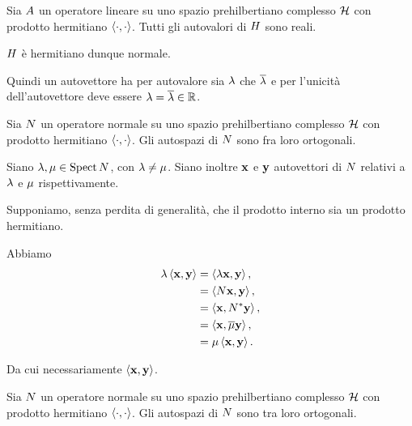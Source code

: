 \begin{Corollary}
  Sia $A$ un operatore lineare su uno spazio prehilbertiano
  complesso $\mathcal{H}$ con prodotto hermitiano
  $\left \langle \cdot , \cdot \right \rangle$. Tutti gli autovalori di
  $H$ sono reali.
\end{Corollary}
\Proof $H$ \`e hermitiano dunque normale.
\par Quindi un autovettore ha per autovalore sia $\lambda$ che
$\overline{\lambda}$ e per l'unicit\`a dell'autovettore deve essere
$\lambda = \overline{\lambda} \in \mathbb{R}$. \EndProof
\begin{Corollary}
  Sia $N$ un operatore normale su uno spazio prehilbertiano
  complesso $\mathcal{H}$ con prodotto hermitiano
  $\left \langle \cdot , \cdot \right \rangle$.
  Gli autospazi di $N$ sono fra loro ortogonali.
\end{Corollary}
\Proof Siano $\lambda, \mu \in \operatorname{Spect}{N}$,
con $\lambda \neq \mu$.
Siano inoltre $\Eigenvector$ e $\VarEigenvector$ autovettori di
$N$ relativi a $\lambda$ e $\mu$
rispettivamente.
\par Supponiamo, senza perdita di generalit\`a, che il prodotto interno sia
un prodotto hermitiano.
\par Abbiamo
\begin{align*}
  \Eigenvalue \HermitianProduct{\Eigenvector}{\VarEigenvector}
  &= \HermitianProduct{\Eigenvalue\Eigenvector}{\VarEigenvector},\\
  &= \HermitianProduct{\NormalOperator\Eigenvector}{\VarEigenvector},\\
  &= \HermitianProduct{\Eigenvector}{\Adjoint{\NormalOperator}\VarEigenvector},\\
  &= \HermitianProduct{\Eigenvector}{\Conjugate{\VarEigenvalue}\VarEigenvector},\\
  &= \VarEigenvalue\HermitianProduct{\Eigenvector}{\VarEigenvector}.
\end{align*}
\par Da cui necessariamente
$\HermitianProduct{\Eigenvector}{\VarEigenvector}$. \EndProof
\begin{Theorem}
  Sia $N$ un operatore normale su uno spazio prehilbertiano
  complesso $\mathcal{H}$ con prodotto hermitiano
  $\left \langle \cdot , \cdot \right \rangle$.
  Gli autospazi di $N$ sono tra loro ortogonali.
\end{Theorem}
